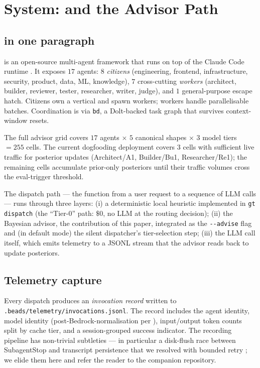 \section{System: \blackrim and the Advisor Path}
\label{sec:system}

\subsection{\blackrim in one paragraph}

\blackrim \cite{german2026blackrim} is an open-source multi-agent framework
that runs on top of the Claude Code runtime \cite{anthropic2024claudecode}.
It exposes $17$ agents: $8$ \emph{citizens} (engineering, frontend,
infrastructure, security, product, data, ML, knowledge), $7$ cross-cutting
\emph{workers} (architect, builder, reviewer, tester, researcher, writer,
judge), and $1$ general-purpose escape hatch. Citizens own a vertical and
spawn workers; workers handle parallelisable batches. Coordination is via
\texttt{bd}, a Dolt-backed task graph that survives context-window resets.

The full advisor grid covers $17$ agents $\times$ $5$ canonical shapes
$\times$ $3$ model tiers $= 255$ cells. The current dogfooding deployment
covers $3$ cells with sufficient live traffic for posterior updates
(Architect/A1, Builder/Bu1, Researcher/Re1); the remaining cells accumulate
prior-only posteriors until their traffic volumes cross the eval-trigger
threshold.

The dispatch path --- the function from a user request to a sequence of
LLM calls --- runs through three layers: (i) a deterministic local heuristic
implemented in \texttt{gt dispatch} (the ``Tier-0'' path: $\$0$, no LLM at
the routing decision); (ii) the Bayesian advisor, the contribution of this
paper, integrated as the \texttt{-{}-advise} flag and (in default mode)
the silent dispatcher's tier-selection step; (iii) the LLM call itself, which
emits telemetry to a JSONL stream that the advisor reads back to update
posteriors.

\subsection{Telemetry capture}

Every dispatch produces an \emph{invocation record} written to
\texttt{.beads/telemetry/invocations.jsonl}. The record includes the agent
identity, model identity (post-Bedrock-normalisation per
\cite{german2026bedrock}), input/output token counts split by cache tier,
and a session-grouped success indicator. The recording pipeline has
non-trivial subtleties --- in particular a disk-flush race between
SubagentStop and transcript persistence that we resolved with bounded retry
\cite{blackrim_hyqd}; we elide them here and refer the reader to the
companion repository.

